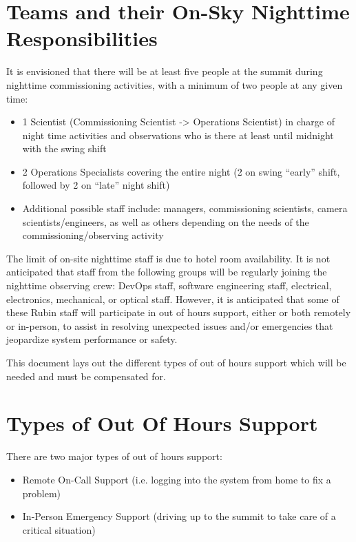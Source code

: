 \section{Teams and their On-Sky Nighttime Responsibilities}

It is envisioned that there will be at least five people at the summit during nighttime commissioning activities, with a minimum of two people at any given time:

\begin{itemize}
    \item 1 Scientist (Commissioning Scientist -> Operations Scientist) in charge of night time activities and observations who is there at least until midnight with the swing shift
    \item 2 Operations Specialists covering the entire night (2 on swing ``early'' shift, followed by 2 on ``late'' night shift)
    \item Additional possible staff include: managers, commissioning scientists, camera scientists/engineers, as well as others depending on the needs of the commissioning/observing activity
\end{itemize}

The limit of on-site nighttime staff is due to hotel room availability.  It is not anticipated that staff from the following groups will be regularly joining the nighttime observing crew: DevOps staff, software engineering staff, electrical, electronics, mechanical, or optical staff.
However, it is anticipated that some of these Rubin staff will participate in out of hours support, either or both remotely or in-person, to assist in resolving unexpected issues and/or emergencies that jeopardize system performance or safety.

This document lays out the different types of out of hours support which will be needed and must be compensated for.

\section{Types of Out Of Hours Support}

There are two major types of out of hours support:

\begin{itemize}
    \item Remote On-Call Support (i.e. logging into the system from home to fix a problem)
    \item In-Person Emergency Support (driving up to the summit to take care of a critical situation)
\end{itemize}

